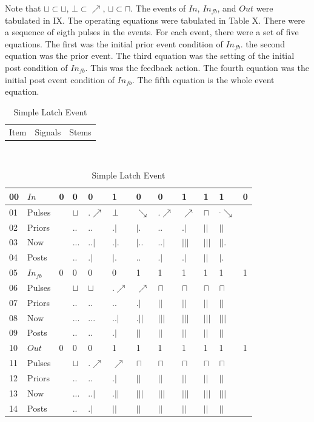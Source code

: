 \documentclass[10pt,journal]{IEEEtran}
\begin{document}
Note that $\sqcup\subset\sqcup$,    $\bot\subset\nearrow$,    $\sqcup\subset\sqcap$.   The events of $In$, $In_{fb}$, and $Out$ were tabulated in    IX. The operating equations were tabulated in Table X. There were a sequence    of eigth pulses in the events. For each event, there were a set of five    equations. The first was the initial prior event condition of $In_{fb}$.     the second equation was the prior event. The third equation was the    setting of the initial post condition of $In_{fb}$. This was the    feedback action. The fourth equation was the initial post event condition of    $In_{fb}$. The fifth equation is the whole event equation.
\begin{table}[H] \caption{Simple Latch Event}\centering\begin{tabular}{|p{.3cm}|p{.6cm}|p{6.424cm}|}\hline Item&Signals &Stems \\ \end{tabular} \\ \begin{tabular}{|p{.3cm}|p{.6cm}|p{.25cm}|p{.25cm}|p{.25cm}|p{.25cm}|p{.25cm}                                 |p{.25cm}|p{.25cm}|p{.25cm}|p{.25cm}|p{.25cm}|}\hline 00&$In$&0&0&0&1&0&0&1&1&1&0 \\ \hline 01&Pulses& &$\sqcup$&$.\nearrow$&$\bot$&$\searrow$&$.\nearrow$&$\nearrow$&$\sqcap$&$^.\searrow$& \\ \hline 02&Priors& &$..$&$..$&$.|$&$|.$&$..$&$.|$&$||$&$||$& \\ \hline 03&Now   & &$...$&$..|$&$.|.$&$|..$&$..|$&$|||$&$|||$&$||.$& \\ \hline 04&Posts& &$..$&$.|$&$|.$&$..$&$.|$&$.|$&$||$&$|.$& \\ \hline 05&$In_{fb}$&0&0&0&0&1&1&1&1&1&1 \\ \hline 06&Pulses& &$\sqcup$&$\sqcup$&$.\nearrow$&$\nearrow$&$\sqcap$&$\sqcap$&$\sqcap$&$\sqcap$& \\ \hline 07&Priors& &$..$&$..$&$..$&$.|$&$||$&$||$&$||$&$||$& \\ \hline 08&Now   & &$...$&$...$&$..|$&$.||$&$|||$&$|||$&$|||$&$|||$& \\ \hline 09&Posts& &$..$&$..$&$.|$&$||$&$||$&$||$&$||$&$||$& \\ \hline 10&$Out$&0&0&0&1&1&1&1&1&1&1 \\ \hline 11&Pulses& &$\sqcup$&$.\nearrow$&$\nearrow$&$\sqcap$&$\sqcap$&$\sqcap$&$\sqcap$&$\sqcap$& \\ \hline 12&Priors& &$..$&$..$&$.|$&$||$&$||$&$||$&$||$&$||$& \\ \hline 13&Now   & &$...$&$..|$&$.||$&$|||$&$|||$&$|||$&$|||$&$|||$& \\ \hline 14&Posts& &$..$&$.|$&$||$&$||$&$||$&$||$&$||$&$||$& \\ \hline \end{tabular} \end{table} 
\end{document}
